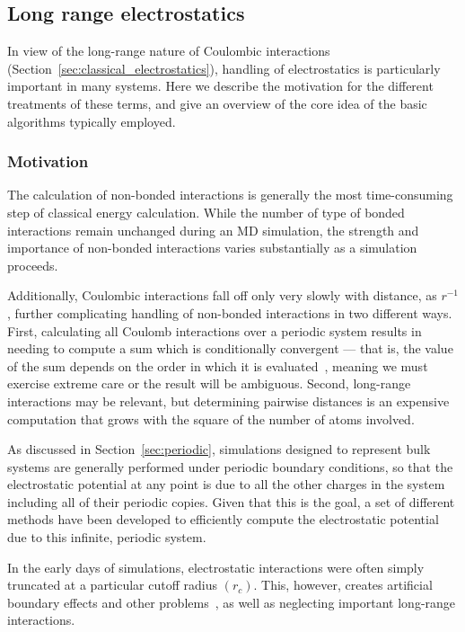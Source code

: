 \documentclass[9pt,bestpractices]{livecoms}
\begin{document}
\subsection{Long range electrostatics}
\label{sec:lr_electrostatics}


In view of the long-range nature of Coulombic interactions (Section~\ref{sec:classical_electrostatics}), handling of electrostatics is particularly important in many systems.
Here we describe the motivation for the different treatments of these terms, and give an overview of the core idea of the basic algorithms typically employed.

\subsubsection{Motivation}

The calculation of non-bonded interactions is generally the most time-consuming step of classical energy calculation.
While the number of type of bonded interactions remain unchanged during an MD simulation, the strength and importance of non-bonded interactions varies substantially as a simulation proceeds.

Additionally, Coulombic interactions fall off only very slowly with distance, as $r^{-1} $, further complicating handling of non-bonded interactions in two different ways.
First, calculating all Coulomb interactions over a periodic system results in needing to compute a sum which is conditionally convergent --- that is, the value of the sum depends on the order in which it is evaluated~\cite{LeachBook}, meaning we must exercise extreme care or the result will be ambiguous.
Second, long-range interactions may be relevant, but determining pairwise distances is an expensive computation that grows with the square of the number of atoms involved.


As discussed in Section~\ref{sec:periodic}, simulations designed to represent bulk systems are generally performed under periodic boundary conditions, so that the electrostatic potential at any point is due to all the other charges in the system including all of their periodic copies.
Given that this is the goal, a set of different methods have been developed to efficiently compute the electrostatic potential due to this infinite, periodic system.

In the early days of simulations, electrostatic interactions were often simply truncated at a particular cutoff radius $(r_c)$.
This, however, creates artificial boundary effects and other problems~\cite{allen_computer_2017}, as well as neglecting important long-range interactions.
\end{document}
